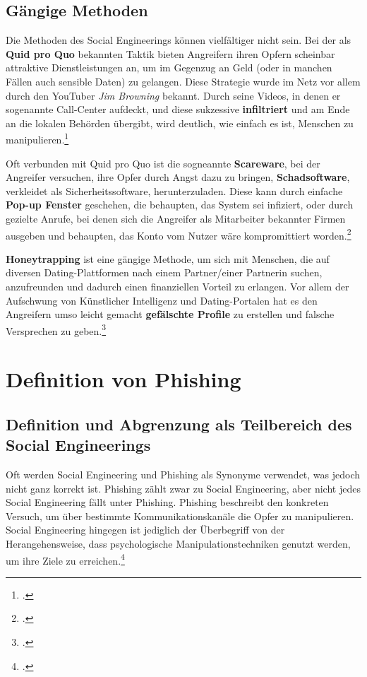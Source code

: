 \documentclass[12pt, a4paper, oneside]{scrartcl}
\begin{document}
\subsection{Gängige Methoden}
\par
Die Methoden des Social Engineerings können vielfältiger nicht sein.
Bei der als \textbf{Quid pro Quo} bekannten Taktik bieten Angreifern ihren Opfern scheinbar attraktive Dienstleistungen an, um im Gegenzug
an Geld (oder in manchen Fällen auch sensible Daten) zu gelangen. Diese Strategie wurde im Netz vor allem durch den YouTuber \textit{Jim Browning} bekannt.
Durch seine Videos, in denen er sogenannte Call-Center aufdeckt, und diese sukzessive \textbf{infiltriert} und
am Ende an die lokalen Behörden übergibt, wird deutlich, wie einfach es ist, Menschen zu manipulieren.\footcite{JB_YouTube}
\par
Oft verbunden mit Quid pro Quo ist die sogneannte \textbf{Scareware}, bei der Angreifer versuchen, ihre Opfer 
durch Angst dazu zu bringen, \textbf{Schadsoftware}, verkleidet als Sicherheitssoftware, herunterzuladen. Diese kann 
durch einfache \textbf{Pop-up Fenster} geschehen, die behaupten, das System sei infiziert, oder durch gezielte
Anrufe, bei denen sich die Angreifer als Mitarbeiter bekannter Firmen ausgeben und behaupten, das Konto
vom Nutzer wäre kompromittiert worden.\footcite{Keeper_Scareware}
\par
\textbf{Honeytrapping} ist eine gängige Methode, um sich mit Menschen, die auf diversen Dating-Plattformen nach
einem Partner/einer Partnerin suchen, anzufreunden und dadurch einen finanziellen Vorteil zu erlangen. Vor allem 
der Aufschwung von Künstlicher Intelligenz und Dating-Portalen hat es den Angreifern umso leicht gemacht
\textbf{gefälschte Profile} zu erstellen und falsche Versprechen zu geben.\footcite{CS_10Arten}\\

\section{Definition von Phishing}

\subsection{Definition und Abgrenzung als Teilbereich des Social Engineerings}
Oft werden Social Engineering und Phishing als Synonyme verwendet, was jedoch nicht ganz korrekt ist.
Phishing zählt zwar zu Social Engineering, aber nicht jedes Social Engineering fällt unter Phishing. 
Phishing beschreibt den konkreten Versuch, um über bestimmte Kommunikationskanäle die Opfer zu manipulieren.
Social Engineering hingegen ist jediglich der Überbegriff von der Herangehensweise, dass psychologische
Manipulationstechniken genutzt werden, um ihre Ziele zu erreichen.\footcite{Keeper_Phishing}
\end{document}

